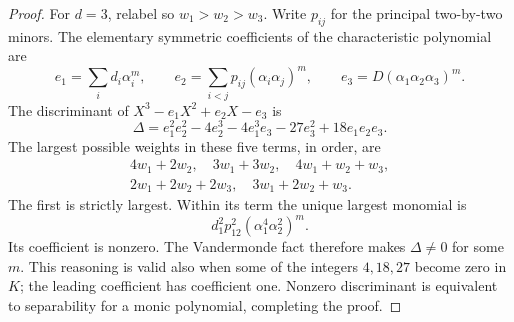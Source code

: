 \begin{proof}
For \(d=3\), relabel so \(w_1>w_2>w_3\).
Write \(p_{ij}\) for the principal two-by-two minors.
The elementary symmetric coefficients of the characteristic
polynomial are
\[
 e_1=\sum_i d_i\alpha_i^m,\qquad
 e_2=\sum_{i<j}p_{ij}(\alpha_i\alpha_j)^m,\qquad
 e_3=D(\alpha_1\alpha_2\alpha_3)^m .
\]
The discriminant of \(X^3-e_1X^2+e_2X-e_3\) is
\[
 \Delta=e_1^2e_2^2-4e_2^3-4e_1^3e_3
                       -27e_3^2+18e_1e_2e_3 .
\]
The largest possible weights in these five terms, in order,
are
\[
 \begin{gathered}
 4w_1+2w_2,\quad 3w_1+3w_2,\quad
 4w_1+w_2+w_3,\\
 2w_1+2w_2+2w_3,\quad 3w_1+2w_2+w_3 .
 \end{gathered}
\]
The first is strictly largest.
Within its term the unique largest monomial is
\[
              d_1^2p_{12}^2(\alpha_1^4\alpha_2^2)^m .
\]
Its coefficient is nonzero.  The Vandermonde fact therefore
makes \(\Delta\ne0\) for some \(m\).
This reasoning is valid also when some of the integers
\(4,18,27\) become zero in \(K\); the leading coefficient
has coefficient one.
Nonzero discriminant is equivalent to separability for a
monic polynomial, completing the proof.
\end{proof}


